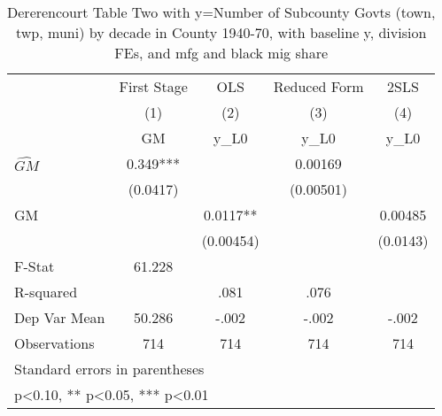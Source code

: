 \begin{table}[htbp]\centering
\def\sym#1{\ifmmode^{#1}\else\(^{#1}\)\fi}
\caption{Dererencourt Table Two with y=Number of Subcounty Govts (town, twp, muni) by decade in County 1940-70, with baseline y, division FEs, and mfg and black mig share}
\begin{tabular}{l*{4}{c}}
\toprule
                    & First Stage   &         OLS   &Reduced Form   &        2SLS   \\
                    &\multicolumn{1}{c}{(1)}&\multicolumn{1}{c}{(2)}&\multicolumn{1}{c}{(3)}&\multicolumn{1}{c}{(4)}\\
                    &\multicolumn{1}{c}{GM}&\multicolumn{1}{c}{y\_L0}&\multicolumn{1}{c}{y\_L0}&\multicolumn{1}{c}{y\_L0}\\
\midrule
$\hat{GM}$          &       0.349***&               &     0.00169   &               \\
                    &    (0.0417)   &               &   (0.00501)   &               \\
\addlinespace
GM                  &               &      0.0117** &               &     0.00485   \\
                    &               &   (0.00454)   &               &    (0.0143)   \\
\midrule
F-Stat              &      61.228   &               &               &               \\
R-squared           &               &        .081   &        .076   &               \\
Dep Var Mean        &      50.286   &       -.002   &       -.002   &       -.002   \\
Observations        &         714   &         714   &         714   &         714   \\
\bottomrule
\multicolumn{5}{l}{\footnotesize Standard errors in parentheses}\\
\multicolumn{5}{l}{\footnotesize * p<0.10, ** p<0.05, *** p<0.01}\\
\end{tabular}
\end{table}
